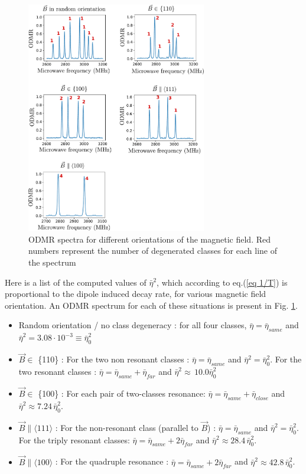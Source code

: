 \documentclass[preprintnumbers,amsmath,amssymb,onecolumn,12pt]{revtex4-2}
\begin{document}
\begin{figure}
\includegraphics[width=0.7\textwidth]{Figures_SI/Various ESR}
\caption{ODMR spectra for different orientations of the magnetic field. Red numbers represent the number of degenerated classes for each line of the spectrum}
\label{Various ODMR}
\end{figure}

Here is a list of the computed values of $\bar \eta^2$, which according to eq.(\ref{eq 1/T}) is proportional to the dipole induced decay rate, for various magnetic field orientation. An ODMR spectrum for each of these situations is present in Fig. \ref{Various ODMR}.
\begin{itemize}
\item Random orientation / no class degeneracy : for all four classes, $\bar \eta = \bar {\eta}_{same}$ and $\bar \eta^2=3.08 \cdot 10^{-3} \equiv \bar \eta_0^2$
\item $\vec{B} \in$ \{110\} : For the two non resonant classes : $\bar \eta = \bar {\eta}_{same}$ and $\bar \eta^2= \bar \eta_0^2$.  For the two resonant classes : $\bar \eta = \bar {\eta}_{same} + \bar {\eta}_{far}$ and $\bar \eta^2\approx\, 10.0 \bar \eta_0^2$
\item $\vec{B} \in$ \{100\} : For each pair of two-classes resonance: $\bar \eta = \bar {\eta}_{same}+\bar {\eta}_{close}$ and $\bar \eta^2\approx 7.24\, \bar \eta_0^2$. 
\item $\vec{B} \parallel \langle 111 \rangle$ : For the non-resonant class (parallel to $\vec B$) : $\bar \eta = \bar {\eta}_{same}$ and $\bar \eta^2= \bar \eta_0^2$. For the triply resonant classes: $\bar \eta = \bar {\eta}_{same}+2\bar {\eta}_{far}$ and $\bar \eta^2\approx 28.4\, \bar \eta_0^2$. 
\item $\vec{B} \parallel \langle 100 \rangle$ : For the quadruple resonance : $\bar \eta = \bar {\eta}_{same}+2\bar {\eta}_{far}$ and $\bar \eta^2\approx 42.8\, \bar \eta_0^2$.
\end{itemize}
\end{document}
